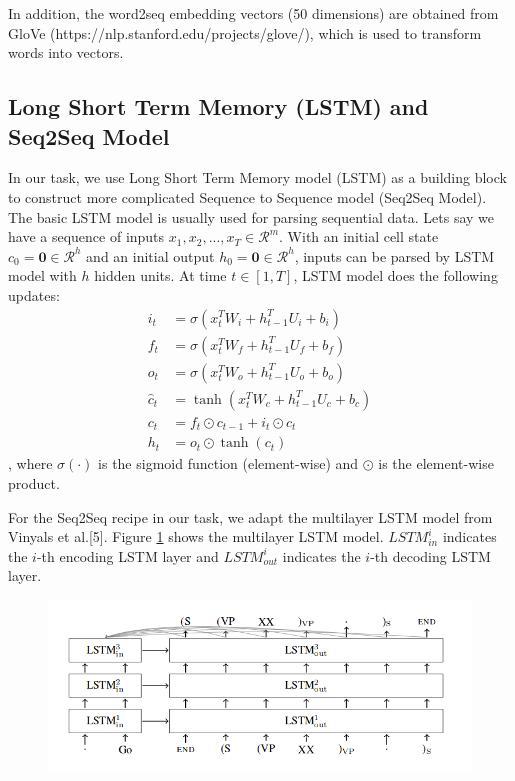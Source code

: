 \documentclass{article}
\begin{document}
In addition, the word2seq embedding vectors (50 dimensions) are obtained from GloVe (https://nlp.stanford.edu/projects/glove/), which is used to transform words into vectors. 

\subsection{Long Short Term Memory (LSTM) and Seq2Seq Model}
In our task, we use Long Short Term Memory model (LSTM) as a building block to construct more complicated Sequence to Sequence model (Seq2Seq Model). The basic LSTM model is usually used for parsing sequential data. Lets say we have a sequence of inputs $x_1, x_2, ..., x_T \in \mathcal{R}^{m}$. With an initial cell state $c_0 = \mathbf{0} \in \mathcal{R}^{h}$ and an initial output $h_0 = \mathbf{0} \in \mathcal{R}^{h}$, inputs can be parsed by LSTM model with $h$ hidden units. At time $t \in [1, T]$, LSTM model does the following updates:
\begin{align*}
i_t &= \sigma(x_{t}^{T}W_i + h_{t-1}^{T}U_i + b_i)\\
f_t &= \sigma(x_{t}^{T}W_f + h_{t-1}^{T}U_f + b_f)\\
o_t &= \sigma(x_{t}^{T}W_o + h_{t-1}^{T}U_o + b_o)\\
\hat c_t &= \tanh(x_{t}^{T}W_c + h_{t-1}^{T}U_c + b_c)\\
c_t &= f_t \odot c_{t-1} + i_t \odot \hat c_t\\
h_t &= o_t \odot \tanh(c_t)
\end{align*}
, where $\sigma(\cdot)$ is the sigmoid function (element-wise) and $\odot$ is the element-wise product.

For the Seq2Seq recipe in our task, we adapt the multilayer LSTM model 
from Vinyals et al.[5]. Figure \ref{fig:LSTM_A} shows the multilayer LSTM model. $LSTM_{in}^{i}$ indicates the $i$-th encoding LSTM layer and $LSTM_{out}^{i}$ indicates the $i$-th decoding LSTM layer.
\begin{figure}[h]
	\centering
	\includegraphics[width=0.7\linewidth]{LSTM_A}
	\caption{}
	\label{fig:LSTM_A}
\end{figure}
\end{document}
